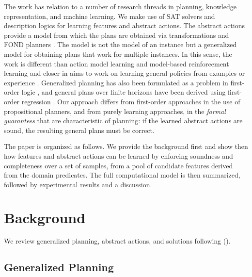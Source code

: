 \documentclass[letterpaper]{article} %
\newcommand{\citeay}[1]{\citeauthor{#1} (\citeyear{#1})}
\begin{document}
The work has relation to a number of research threads in planning, knowledge
representation, and machine learning. We make use of SAT solvers and description
logics for learning features and abstract actions. %
The abstract actions provide a model from which the plans are obtained via
transformations and FOND planners \cite{geffner:book,ghallab:book}.
The model is not the model of an instance but a generalized model for obtaining
plans that work for multiple instances. In this sense, the work is different than
action model learning \cite{yang:action-learning} and model-based reinforcement
learning and closer in aims to work on learning general policies from examples or
experience \cite{martin-geffner:generalized,fern:bias,mazebase,general-drl}.
Generalized planning has also been formulated as a problem in first-order logic
\cite{srivastava:generalized}, and general plans over finite horizons have been
derived using first-order regression \cite{boutilier2001symbolic,wang2008first,van2012solving}.
Our approach differs from first-order approaches in the use of propositional
planners, and from purely learning approaches, in the \emph{formal guarantees} that
are characteristic of planning: if the learned abstract actions are  sound,
the resulting general plans must be correct. 

The paper is organized as follows. We provide the background  first and show then
how features and abstract actions can be learned by enforcing soundness and
completeness over a set of samples, from a pool of candidate features derived from the domain
predicates. The full computational model is then summarized, followed by experimental results
and a discussion.


\section{Background}

We review generalized planning,   abstract actions, and solutions following  \citeay{bonet:ijcai2018}.


\subsection{Generalized Planning}
\end{document}
